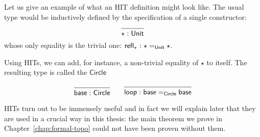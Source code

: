 Let us give an example of what an HIT definition might look like. The usual $\unit{}$
type would be inductively defined by the specification of a single constructor:
\begin{equation*}
  \begin{prooftree}
    \infer0{\oftyI{\star}{\unit{}}}
  \end{prooftree}
\end{equation*}
whose only equality is the trivial one: $\mathsf{refl}_\star\hspace{0.1mm}:\hspace{0.1mm}\star =_{\mathsf{Unit}{}} \star$.

Using HITs, we can add, for instance, a non-trivial equality of $\star$ to itself. The
resulting type is called the $\mathsf{Circle}$

\begin{equation*}
  \begin{prooftree}
    \infer0{\oftyI{\mathsf{base}}{\mathsf{Circle}}}
  \end{prooftree}
  \hspace{2em}
  \begin{prooftree}
    \infer0{\oftyI{\mathsf{loop}}{\mathsf{base} =_{\mathsf{Circle}} \mathsf{base}}}
  \end{prooftree}
\end{equation*}

HITs turn out to be immensely useful and in fact we will explain later that they are used
in a crucial way in this thesis: the main theorem we prove in
Chapter~\ref{chap:formal-topo} could not have been proven without them.

